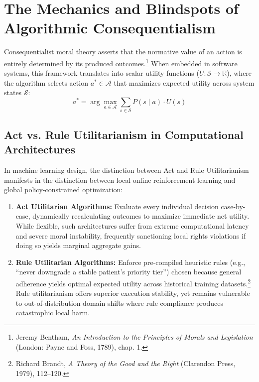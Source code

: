 \documentclass[11pt,a4paper]{article}
\begin{document}
\section{The Mechanics and Blindspots of Algorithmic Consequentialism}

Consequentialist moral theory asserts that the normative value of an action is entirely determined by its produced outcomes.\footnote{Jeremy Bentham, \textit{An Introduction to the Principles of Morals and Legislation} (London: Payne and Foss, 1789), chap. 1.} When embedded in software systems, this framework translates into scalar utility functions ($U: \mathcal{S} \to \mathbb{R}$), where the algorithm selects action $a^* \in \mathcal{A}$ that maximizes expected utility across system states $\mathcal{S}$:
\begin{equation}
a^* = \arg\max_{a \in \mathcal{A}} \sum_{s \in \mathcal{S}} P(s \mid a) \cdot U(s)
\end{equation}

\subsection{Act vs. Rule Utilitarianism in Computational Architectures}
In machine learning design, the distinction between Act and Rule Utilitarianism manifests in the distinction between local online reinforcement learning and global policy-constrained optimization:

\begin{enumerate}[label=\lbrack\arabic*\rbrack, leftmargin=1.8em, itemsep=0.01em]
    \item \textbf{Act Utilitarian Algorithms:} Evaluate every individual decision case-by-case, dynamically recalculating outcomes to maximize immediate net utility. While flexible, such architectures suffer from extreme computational latency and severe moral instability, frequently sanctioning local rights violations if doing so yields marginal aggregate gains.
    \item \textbf{Rule Utilitarian Algorithms:} Enforce pre-compiled heuristic rules (e.g., ``never downgrade a stable patient's priority tier'') chosen because general adherence yields optimal expected utility across historical training datasets.\footnote{Richard Brandt, \textit{A Theory of the Good and the Right} (Clarendon Press, 1979), 112--120.} Rule utilitarianism offers superior execution stability, yet remains vulnerable to out-of-distribution domain shifts where rule compliance produces catastrophic local harm.
\end{enumerate}
\end{document}
